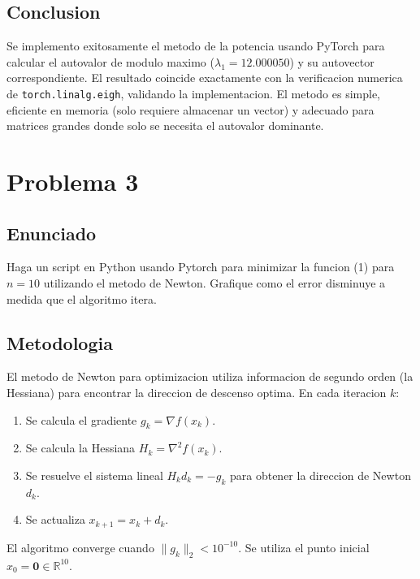 \documentclass{article}
\begin{document}
\subsection{Conclusion}

Se implemento exitosamente el metodo de la potencia usando PyTorch para calcular el autovalor de modulo maximo ($\lambda_1 = 12.000050$) y su autovector correspondiente. El resultado coincide exactamente con la verificacion numerica de \texttt{torch.linalg.eigh}, validando la implementacion. El metodo es simple, eficiente en memoria (solo requiere almacenar un vector) y adecuado para matrices grandes donde solo se necesita el autovalor dominante.


\section{Problema 3}

\subsection{Enunciado}

Haga un script en Python usando Pytorch para minimizar la funcion (1) para $n = 10$ utilizando el metodo de Newton. Grafique como el error disminuye a medida que el algoritmo itera.

\subsection{Metodologia}

El metodo de Newton para optimizacion utiliza informacion de segundo orden (la Hessiana) para encontrar la direccion de descenso optima. En cada iteracion $k$:
\begin{enumerate}
    \item Se calcula el gradiente $g_k = \nabla f(x_k)$.
    \item Se calcula la Hessiana $H_k = \nabla^2 f(x_k)$.
    \item Se resuelve el sistema lineal $H_k d_k = -g_k$ para obtener la direccion de Newton $d_k$.
    \item Se actualiza $x_{k+1} = x_k + d_k$.
\end{enumerate}

El algoritmo converge cuando $\|g_k\|_2 < 10^{-10}$. Se utiliza el punto inicial $x_0 = \mathbf{0} \in \mathbb{R}^{10}$.
\end{document}
